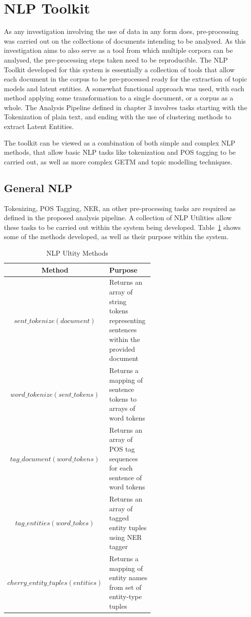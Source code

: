\documentclass[10pt]{report}
\begin{document}
\section{NLP Toolkit}
As any investigation involving the use of data in any form does, pre-processing was carried out on the collections of documents intending to be analysed. As this investigation aims to also serve as a tool from which multiple corpora can be analysed, the pre-processing steps taken need to be reproducible. The NLP Toolkit developed for this system is essentially a collection of tools that allow each document in the corpus to be pre-processed ready for the extraction of topic models and latent entities. A somewhat functional approach was used, with each method applying some transformation to a single document, or a corpus as a whole. The Analysis Pipeline defined in chapter 3 involves tasks starting with the Tokenization of plain text, and ending with the use of clustering methods to extract Latent Entities.

The toolkit can be viewed as a combination of both simple and complex NLP methods, that allow basic NLP tasks like tokenization and POS tagging to be carried out, as well as more complex GETM and topic modelling techniques.

\subsection{General NLP}
Tokenizing, POS Tagging, NER, an other pre-processing tasks are required as defined in the proposed analysis pipeline. A collection of NLP Utilities allow these tasks to be carried out within the system being developed. Table~\ref{tab:nlp_utilities} shows some of the methods developed, as well as their purpose within the system. 

\renewcommand{\arraystretch}{2.0}
\renewcommand{\baselinestretch}{1.0}\normalsize
\begin{table}[h!]
  \begin{tabular}{c | p{0.6\linewidth} }
    Method & Purpose\\
    \hline
    $sent\_tokenize(document)$ & Returns an array of string tokens representing sentences within the provided document  \\
    $word\_tokenize(sent\_tokens)$& Returns a mapping of sentence tokens to arrays of word tokens \\
    $tag\_document(word\_tokens)$ & Returns an array of POS tag sequences for each sentence of word tokens\\
    $tag\_entities(word\_tokes)$ & Returns an array of tagged entity tuples using NER tagger\\
    $cherry\_entity\_tuples(entities)$ & Returns a mapping of entity names from set of entity-type tuples\\
  \end{tabular}
  \caption{NLP Ultity Methods\label{tab:nlp_utilities}}
\end{table}
\renewcommand{\baselinestretch}{2.0}\normalsize
\renewcommand{\arraystretch}{1.0}
\end{document}
